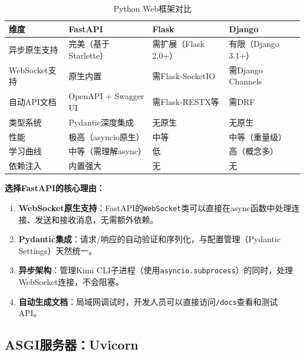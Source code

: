 \documentclass[fontset=mac,a4paper,11pt]{ctexart}
\begin{document}
\begin{table}[H]
\centering
\caption{Python Web框架对比}
\label{tab:web-framework}
\begin{tabular}{L{2.5cm}L{3.5cm}L{3.5cm}L{3.5cm}}
\toprule
\textbf{维度} & \textbf{FastAPI} & \textbf{Flask} & \textbf{Django} \\
\midrule
{}
异步原生支持 & 完美（基于Starlette） & 需扩展（Flask 2.0+） & 有限（Django 3.1+） \\
WebSocket支持 & 原生内置 & 需Flask-SocketIO & 需Django Channels \\
自动API文档 & OpenAPI + Swagger UI & 需Flask-RESTX等 & 需DRF \\
类型系统 & Pydantic深度集成 & 无原生 & 无原生 \\
性能 & 极高（asyncio原生） & 中等 & 中等（重量级） \\
学习曲线 & 中等（需理解async） & 低 & 高（概念多） \\
依赖注入 & 内置强大 & 无 & 无 \\
\bottomrule
\end{tabular}
\end{table}

\textbf{选择FastAPI的核心理由：}

\begin{enumerate}[leftmargin=2em]
\item \textbf{WebSocket原生支持}：FastAPI的\texttt{WebSocket}类可以直接在async函数中处理连接、发送和接收消息，无需额外依赖。
\item \textbf{Pydantic集成}：请求/响应的自动验证和序列化，与配置管理（Pydantic Settings）天然统一。
\item \textbf{异步架构}：管理Kimi CLI子进程（使用\texttt{asyncio.subprocess}）的同时，处理WebSocket连接，不会阻塞。
\item \textbf{自动生成文档}：局域网调试时，开发人员可以直接访问\texttt{/docs}查看和测试API。
\end{enumerate}

\subsection{ASGI服务器：Uvicorn}
\end{document}
